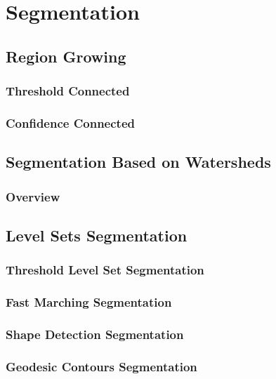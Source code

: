 
\chapter{Segmentation}


\section{Region Growing}

\subsection{Threshold Connected}

\subsection{Confidence Connected}
\label{sec:ConfidenceConnected}



\section{Segmentation Based on Watersheds}
\label{sec:WatershedSegmentation}


\subsection{Overview}
\label{sec:aboutWatersheds}
%



\section{Level Sets Segmentation}
\label{sec:LevelSetsSegmentation}

\subsection{Threshold Level Set Segmentation}
\subsection{Fast Marching Segmentation}
\subsection{Shape Detection Segmentation}
\subsection{Geodesic Contours Segmentation}


